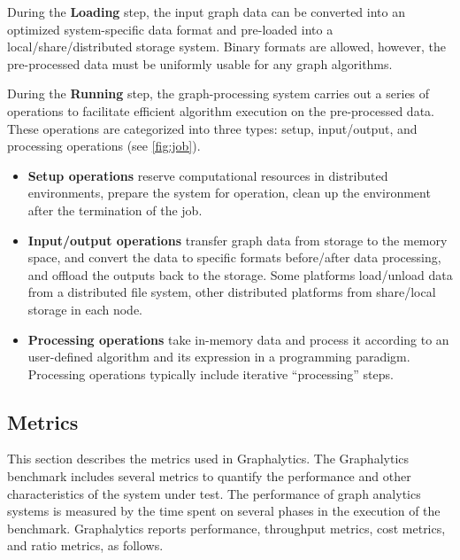 During the \textbf{Loading} step, the input graph data can be converted into an optimized system-specific data format and pre-loaded into a local/share/distributed storage system. Binary formats are allowed, however, the pre-processed data must be uniformly usable for any graph algorithms. 

During the \textbf{Running} step, the graph-processing system carries out a series of operations to facilitate efficient algorithm execution on the pre-processed data. These operations are categorized into three types: setup, input/output, and processing operations (see \autoref{fig:job}).
\begin{itemize}
    \item \textbf{Setup operations} reserve computational resources in distributed environments, prepare the system for operation, clean up the environment after the termination of the job.
    \item \textbf{Input/output operations} transfer graph data from storage to the memory space, and convert the data to specific formats before/after data processing, and offload the outputs back to the storage. Some platforms load/unload data from a distributed file system, other distributed platforms from share/local storage in each node. 
    \item \textbf{Processing operations} take in-memory data and process it according to an user-defined algorithm and its expression in a programming paradigm. Processing operations typically include iterative ``processing'' steps.
\end{itemize}








\subsection{Metrics} 
\label{sec:def:metrics}
This section describes the metrics used in Graphalytics. The Graphalytics benchmark includes several metrics to quantify the performance and other characteristics of the system under test. The performance of graph analytics systems is measured by the time spent on several phases in the execution of the benchmark. Graphalytics reports performance, throughput metrics, cost metrics, and ratio metrics, as follows.



